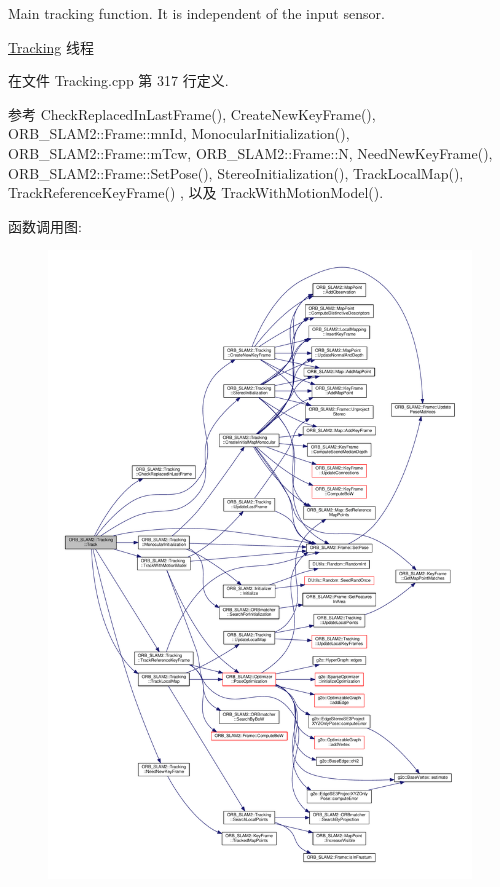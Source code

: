 Main tracking function. It is independent of the input sensor. 

\hyperlink{classORB__SLAM2_1_1Tracking}{Tracking} 线程 

在文件 Tracking.\-cpp 第 317 行定义.



参考 Check\-Replaced\-In\-Last\-Frame(), Create\-New\-Key\-Frame(), O\-R\-B\-\_\-\-S\-L\-A\-M2\-::\-Frame\-::mn\-Id, Monocular\-Initialization(), O\-R\-B\-\_\-\-S\-L\-A\-M2\-::\-Frame\-::m\-Tcw, O\-R\-B\-\_\-\-S\-L\-A\-M2\-::\-Frame\-::\-N, Need\-New\-Key\-Frame(), O\-R\-B\-\_\-\-S\-L\-A\-M2\-::\-Frame\-::\-Set\-Pose(), Stereo\-Initialization(), Track\-Local\-Map(), Track\-Reference\-Key\-Frame() , 以及 Track\-With\-Motion\-Model().



函数调用图\-:
\nopagebreak
\begin{figure}[H]
\begin{center}
\leavevmode
\includegraphics[width=350pt]{classORB__SLAM2_1_1Tracking_af1f2c9c533642d8c33854540e90d1918_cgraph}
\end{center}
\end{figure}


